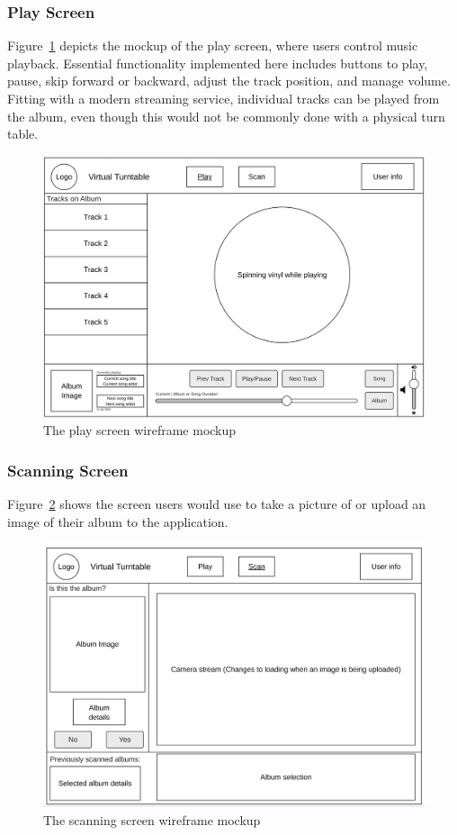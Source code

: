 \subsubsection{Play Screen}
Figure~\ref{fig:play_screen_mockup} depicts the mockup of the play screen, where users control music playback. Essential functionality implemented here includes buttons to play, pause, skip forward or backward, adjust the track position, and manage volume. Fitting with a modern streaming service, individual tracks can be played from the album, even though this would not be commonly done with a physical turn table.
\begin{figure} [H]
    \centering
    \includegraphics[width=0.6\linewidth]{figures/play_screen_mockup.png}
    \caption{The play screen wireframe mockup}
    \label{fig:play_screen_mockup}
\end{figure}

\subsubsection{Scanning Screen}
Figure~\ref{fig:scan_screen_mockup} shows the screen users would use to take a picture of or upload an image of their album to the application.
\begin{figure} [H]
    \centering
    \includegraphics[width=0.6\linewidth]{figures/scan_screen_mockup.png}
    \caption{The scanning screen wireframe mockup}
    \label{fig:scan_screen_mockup}
\end{figure}


